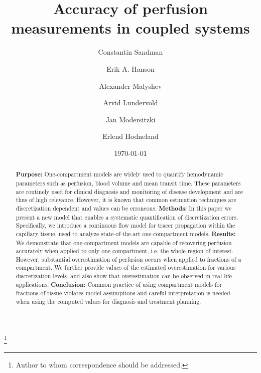 \documentclass[aps,prb,article,groupedaddress,showkeys]{revtex4}
\begin{document}
\def\papertitle{Accuracy of perfusion measurements in coupled systems}
\title{\papertitle}

\author{Constantin Sandman}
\author{Erik A. Hanson}
\author{Alexander Malyshev}
\author{Arvid Lundervold}
\author{Jan Modersitzki}
\author{Erlend Hodneland}
\thanks{Author to whom correspondence should be addressed.}


\date{\today}

\newcommand{\missingsource}{\textcolor{red}{[?]}}
\newlength{\fwd}
\newlength{\fht}


\begin{abstract}    %
\textbf{Purpose:} One-compartment models are widely used to quantify hemodynamic parameters such as perfusion, blood volume and mean transit time. These parameters are routinely used for clinical diagnosis and monitoring of disease development and are thus of high relevance. However, it is known that common estimation techniques are discretization dependent and values can be erroneous. 
\textbf{Methods:} In this paper we present a new model that enables a systematic quantification of discretization errors. Specifically, we introduce a continuous flow model for tracer propagation within the capillary tissue, used to analyze state-of-the-art one-compartment models. 
\textbf{Results:} We demonstrate that one-compartment models are capable of recovering perfusion accurately when applied to only one compartment, i.e. the whole region of interest. However, substantial overestimation of perfusion occurs when applied to fractions of a compartment. We further provide values of the estimated overestimation for various discretization levels, and also show that overestimation can be observed in real-life applications. 
\textbf{Conclusion:} Common practice of using compartment models for fractions of tissue violates model assumptions and careful interpretation is needed when using the computed values for diagnosis and treatment planning.
\end{abstract}
\end{document}
